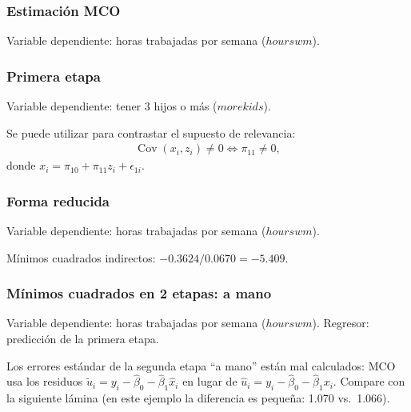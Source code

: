 \documentclass[t, compress, spanish, aspectratio=169]{beamer}
\DeclareMathOperator{\Cov}{Cov}
\begin{document}
\begin{frame}
	\frametitle{Estimaci\'on MCO}
	Variable dependiente: horas trabajadas por semana ($hourswm$).
	\begin{center}
	\footnotesize\renewcommand{\arraystretch}{0.9}
	
	\end{center}
\end{frame}
\begin{frame}
	\frametitle{Primera etapa}
	Variable dependiente: tener 3 hijos o m\'as ($morekids$).
	\begin{center}
	\footnotesize\renewcommand{\arraystretch}{0.9}
	
	\end{center}
	\small
	\alert{Se puede utilizar para contrastar el supuesto de relevancia}:
	\begin{align*}
		\Cov(x_i,z_i)\neq 0 \iff \pi_{11}\neq 0,
	\end{align*}
	donde $x_i = \pi_{10}+\pi_{11} z_i+\epsilon_{1i}$.
\end{frame}
\begin{frame}
	\frametitle{Forma reducida}
	Variable dependiente: horas trabajadas por semana ($hourswm$).
	\begin{center}
	\footnotesize\renewcommand{\arraystretch}{0.9}
	
	\end{center}
	\small
	M\'inimos cuadrados indirectos: $-0.3624/0.0670 =-5.409$.
\end{frame}
\begin{frame}
	\frametitle{M\'inimos cuadrados en 2 etapas: a mano}
	Variable dependiente: horas trabajadas por semana ($hourswm$). Regresor: predicci\'on de la primera etapa.
	\begin{center}
	\footnotesize\renewcommand{\arraystretch}{0.9}
	
	\end{center}
	\small
	\alert{Los errores est\'andar de la segunda etapa ``a mano'' est\'an mal calculados}: MCO usa los residuos $\tilde u_i=y_i-\hat \beta_0-\hat \beta_1 \hat x_i$ en lugar de $\hat u_i=y_i-\hat \beta_0-\hat \beta_1 x_i$. Compare con la siguiente l\'amina (en este ejemplo la diferencia es peque\~na: 1.070 vs.\ 1.066).
\end{frame}
	
\end{document}
